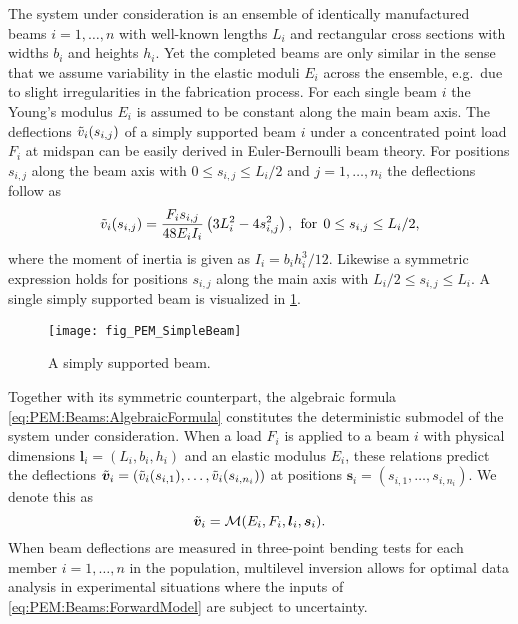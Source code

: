 The system under consideration is an ensemble of identically manufactured beams \(i=1,\ldots,n\) with well-known lengths \(L_i\) and rectangular cross sections with widths \(b_i\) and heights \(h_i\).
Yet the completed beams are only similar in the sense that we assume variability in the elastic moduli \(E_i\) across the ensemble, e.g.\ due to slight irregularities in the fabrication process.
For each single beam \(i\) the Young's modulus \(E_i\) is assumed to be constant along the main beam axis.
The deflections \(\tilde{v}_i(s_{i,j})\) of a simply supported beam \(i\) under a concentrated point load \(F_i\) at midspan can be easily derived in Euler-Bernoulli beam theory.
For positions \(s_{i,j}\) along the beam axis with \(0 \leq s_{i,j} \leq L_i/2\) and \(j=1,\ldots,n_i\) the deflections follow as
\begin{equation} \label{eq:PEM:Beams:AlgebraicFormula}
  \tilde{v}_i(s_{i,j}) = \frac{F_i s_{i,j} }{48 E_i I_i} \left(3 L_i^2 - 4s_{i,j}^2 \right), \;\, \text{for} \;\, 0 \leq s_{i,j} \leq L_i/2,
\end{equation}
where the moment of inertia is given as \(I_i = b_i h_i^3 / 12\).
Likewise a symmetric expression holds for positions \(s_{i,j}\) along the main axis with \(L_i/2 \leq s_{i,j} \leq L_i\).
A single simply supported beam is visualized in \cref{fig:PEM:Beams:SimpleBeam}.
\begin{figure}[ht]
  \centering
  \texttt{[image: fig\_PEM\_SimpleBeam]}
  \caption[A simply supported beam]{A simply supported beam.}
  \label{fig:PEM:Beams:SimpleBeam}
\end{figure}
\par %
Together with its symmetric counterpart, the algebraic formula \cref{eq:PEM:Beams:AlgebraicFormula} constitutes the deterministic submodel of the system under consideration.
When a load \(F_i\) is applied to a beam \(i\) with physical dimensions \(\bm{l}_i = (L_i,b_i,h_i)\) and an elastic modulus \(E_i\),
these relations predict the deflections \(\tilde{\bm{v}}_i = (\tilde{v}_i(s_{i,1}),\ldots,\tilde{v}_i(s_{i,n_i}))\) at positions \(\bm{s}_i = (s_{i,1},\ldots,s_{i,n_i})\).
We denote this as
\begin{equation} \label{eq:PEM:Beams:ForwardModel}
  \tilde{\bm{v}}_i = \mathcal{M}(E_i,F_i,\bm{l}_i,\bm{s}_i).
\end{equation}
When beam deflections are measured in three-point bending tests for each member \(i=1,\ldots,n\) in the population,
multilevel inversion allows for optimal data analysis in experimental situations where the inputs of \cref{eq:PEM:Beams:ForwardModel} are subject to uncertainty.